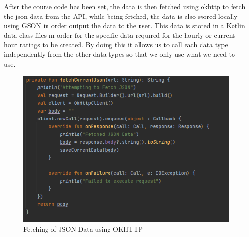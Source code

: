 After the course code has been set, the data is then fetched using okhttp to fetch the json data from the API, while being fetched, the data is also stored locally using GSON in order output the data to the user.
\newline
\newline
This data is stored in a Kotlin data class files in order for the specific data required for the hourly or current hour ratings to be created. By doing this it allows us to call each data type independently from the other data types so that we only use what we need to use.

\begin{figure}[H]
    \centering
    \includegraphics[width=12cm,height = 8cm]{img/DataFetch.PNG}
    \caption{Fetching of JSON Data using OKHTTP}
    \label{fig:altas config}
\end{figure}


